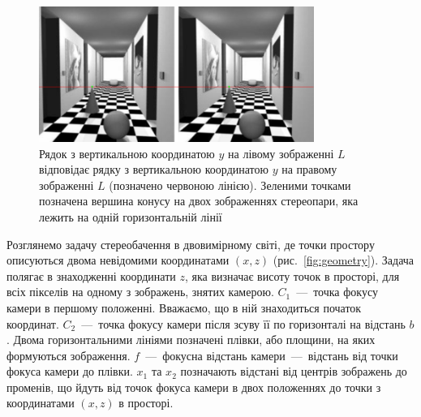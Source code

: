 \begin{figure}[h]
  \centering
  \includegraphics[width=0.8\textwidth]{images/one_line}
  \caption{Рядок з вертикальною координатою $y$
           на лівому зображенні $L$ відповідає
           рядку з вертикальною координатою $y$ на правому зображенні $L$
           (позначено червоною лінією).
           Зеленими точками позначена вершина конусу на двох зображеннях
           стереопари, яка лежить на одній горизонтальній лінії}
  \label{fig:one:line}
\end{figure}

Розглянемо задачу стереобачення в двовимірному світі,
де точки простору описуються двома невідомими координатами
$ \left( x, z \right) $ (рис.~\ref{fig:geometry}).
Задача полягає в знаходженні координати $z$,
яка визначає висоту точок в просторі,
для всіх пікселів на одному з зображень,
знятих камерою.
$C_1$~---~точка фокусу камери в першому положенні.
Вважаємо, що в ній знаходиться початок координат.
$C_2$~---~точка фокусу камери після зсуву її по горизонталі на відстань $b$.
Двома горизонтальними лініями позначені плівки, або площини,
на яких формуються зображення.
$f$~---~фокусна відстань камери~---~відстань від точки фокуса камери до плівки.
$x_1$ та $x_2$ позначають відстані від центрів зображень до променів,
що йдуть від точок фокуса камери в двох положеннях до точки з координатами
$\left(x, z \right)$ в просторі.

